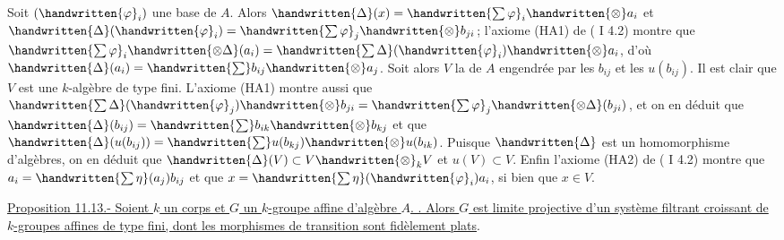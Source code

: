 
Soit $(\handwritten{\varphi}_i)$ une base de $A$. Alors $\handwritten{\Delta}(x)=\handwritten{\sum\varphi}_i\handwritten{\otimes}a_i$ et $\handwritten{\Delta}(\handwritten{\varphi}_i)=\handwritten{\sum\varphi}_j\handwritten{\otimes}b_{ji}$; l'axiome (HA1) de ( I 4.2) montre que $\handwritten{\sum\varphi}_i\handwritten{\otimes\Delta}(a_i)=\handwritten{\sum\Delta}(\handwritten{\varphi}_i)\handwritten{\otimes}a_i$, d'où $\handwritten{\Delta}(a_i)=\handwritten{\sum}b_{ij}\handwritten{\otimes}a_j$. Soit alors $V$ la  de $A$ engendrée par les $b_{ij}$ et les $u(b_{ij})$. Il est clair que $V$ est une $k$-algèbre de type fini. L'axiome (HA1) montre aussi que $\handwritten{\sum\Delta}(\handwritten{\varphi}_j)\handwritten{\otimes}b_{ji}=\handwritten{\sum\varphi}_j\handwritten{\otimes\Delta}(b_{ji})$, et on en déduit que $\handwritten{\Delta}(b_{ij})=\handwritten{\sum}b_{ik}\handwritten{\otimes}b_{kj}$ et que $\handwritten{\Delta}(u(b_{ij}))=\handwritten{\sum}u(b_{kj})\handwritten{\otimes}u(b_{ik})$. Puisque $\handwritten{\Delta}$ est un homomorphisme d'algèbres, on en déduit que $\handwritten{\Delta}(V)\subset V\handwritten{\otimes}_k V$ et $u(V)\subset V$. Enfin l'axiome (HA2) de ( I 4.2) montre que $a_i=\handwritten{\sum\eta}(a_j)b_{ij}$ et que $x=\handwritten{\sum\eta}(\handwritten{\varphi}_i)a_i$, si bien que $x\in V$.

\uline{Proposition 11.13.-  Soient $k$ un corps et $G$ un $k$-groupe affine d'algèbre $A$. . Alors $G$ est limite projective d'un système filtrant croissant de $k$-groupes affines de type fini, dont les morphismes de transition sont fidèlement plats}.


